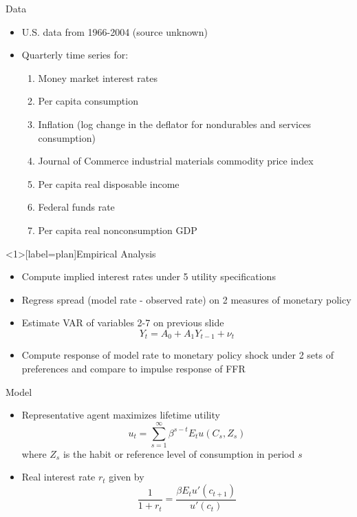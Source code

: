 \documentclass{beamer}
\begin{document}
\begin{frame}{Data}
\begin{itemize}
\item U.S. data from 1966-2004 (source unknown)
\item Quarterly time series for:
    \begin{enumerate}
    \item Money market interest rates
    \item Per capita consumption
    \item Inflation (log change in the deflator for nondurables and services consumption)
    \item Journal of Commerce industrial materials commodity price index
    \item Per capita real disposable income
    \item Federal funds rate
    \item Per capita real nonconsumption GDP
    \end{enumerate}
\end{itemize}
\end{frame}

\begin{frame}<1>[label=plan]{Empirical Analysis}
\begin{itemize}
\item<1,2-> {Compute implied interest rates under 5 utility specifications}
\item<1,3-> {Regress spread (model rate - observed rate) on 2 measures of monetary policy}
\item<1,4-> Estimate VAR of variables 2-7 on previous slide $$Y_t = A_0 + A_1 Y_{t-1} + \nu_t$$
\item<1,4-> Compute response of model rate to monetary policy shock under 2 sets of preferences and compare to impulse response of FFR
\end{itemize}
\end{frame}

\begin{frame}{Model}
\begin{itemize}
\item Representative agent maximizes lifetime utility $$u_t = \sum_{s=1}^\infty \beta^{s-t} E_t u(C_s, Z_s)$$ where $Z_s$ is the habit or reference level of consumption in period $s$
\item Real interest rate $r_t$ given by $$\frac{1}{1 + r_t} = \frac{\beta E_t u'(c_{t+1})}{u'(c_t)}$$
\end{itemize}
\end{frame}
\end{document}
